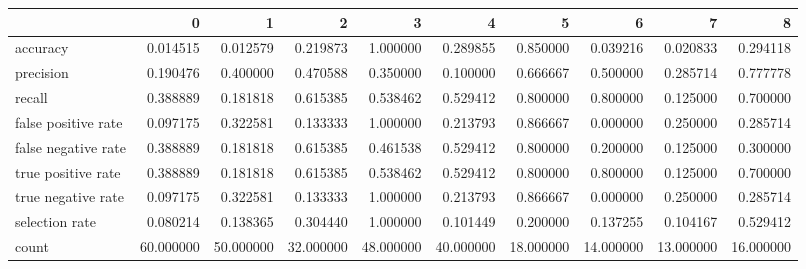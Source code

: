 \begin{tabular}{lrrrrrrrrr}
\toprule
{} &          0 &          1 &          2 &          3 &          4 &          5 &          6 &          7 &          8 \\
\midrule
accuracy            &   0.014515 &   0.012579 &   0.219873 &   1.000000 &   0.289855 &   0.850000 &   0.039216 &   0.020833 &   0.294118 \\
precision           &   0.190476 &   0.400000 &   0.470588 &   0.350000 &   0.100000 &   0.666667 &   0.500000 &   0.285714 &   0.777778 \\
recall              &   0.388889 &   0.181818 &   0.615385 &   0.538462 &   0.529412 &   0.800000 &   0.800000 &   0.125000 &   0.700000 \\
false positive rate &   0.097175 &   0.322581 &   0.133333 &   1.000000 &   0.213793 &   0.866667 &   0.000000 &   0.250000 &   0.285714 \\
false negative rate &   0.388889 &   0.181818 &   0.615385 &   0.461538 &   0.529412 &   0.800000 &   0.200000 &   0.125000 &   0.300000 \\
true positive rate  &   0.388889 &   0.181818 &   0.615385 &   0.538462 &   0.529412 &   0.800000 &   0.800000 &   0.125000 &   0.700000 \\
true negative rate  &   0.097175 &   0.322581 &   0.133333 &   1.000000 &   0.213793 &   0.866667 &   0.000000 &   0.250000 &   0.285714 \\
selection rate      &   0.080214 &   0.138365 &   0.304440 &   1.000000 &   0.101449 &   0.200000 &   0.137255 &   0.104167 &   0.529412 \\
count               &  60.000000 &  50.000000 &  32.000000 &  48.000000 &  40.000000 &  18.000000 &  14.000000 &  13.000000 &  16.000000 \\
\bottomrule
\end{tabular}
